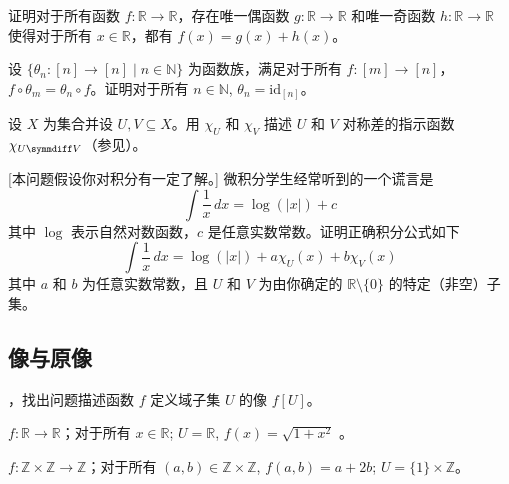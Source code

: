 \begin{chapex}
证明对于所有函数 $f : \mathbb{R} \to \mathbb{R}$，存在唯一偶函数 $g : \mathbb{R} \to \mathbb{R}$ 和唯一奇函数 $h : \mathbb{R} \to \mathbb{R}$ 使得对于所有 $x \in \mathbb{R}$，都有 $f(x)=g(x)+h(x)$。
\end{chapex}

\begin{chapex}
设 $\{ \theta_n : [n] \to [n] \mid n \in \mathbb{N} \}$ 为函数族，满足对于所有 $f : [m] \to [n]$， $f \circ \theta_m = \theta_n \circ f$。证明对于所有 $n \in \mathbb{N}$, $\theta_n = \mathrm{id}_{[n]}$。
\end{chapex}

\begin{chapex}
设 $X$ 为集合并设 $U, V \subseteq X$。用 $\chi_U$ 和 $\chi_V$ 描述 $U$ 和 $V$ 对称差的指示函数 $\chi_{U \symmdiff V}$（参见）。
\end{chapex}

\begin{chapex}
\label{cqAntiderivativeOfLogarithm}
[本问题假设你对积分有一定了解。] 微积分学生经常听到的一个谎言是
\[ \int \dfrac{1}{x} \, dx = \log(|x|) + c \]
其中 $\log$ 表示自然对数函数，$c$ 是任意实数常数。证明正确积分公式如下
\[ \int \dfrac{1}{x} \, dx = \log(|x|) + a \chi_U(x) + b \chi_V(x) \]
其中 $a$ 和 $b$ 为任意实数常数，且 $U$ 和 $V$ 为由你确定的 $\mathbb{R} \setminus \{ 0 \}$ 的特定（非空）子集。
\end{chapex}

\subsection*{像与原像}

，找出问题描述函数 $f$ 定义域子集 $U$ 的像 $f[U]$。

\begin{chapex}
\label{cqComputeImageBegin}
$f : \mathbb{R} \to \mathbb{R}$；对于所有 $x \in \mathbb{R}$; $U = \mathbb{R}$, $f(x) = \sqrt{1+x^2}$ 。
\end{chapex}

\begin{chapex}
$f : \mathbb{Z} \times \mathbb{Z} \to \mathbb{Z}$；对于所有 $(a,b) \in \mathbb{Z} \times \mathbb{Z}$, $f(a,b) = a+2b$; $U = \{ 1 \} \times \mathbb{Z}$。
\end{chapex}

